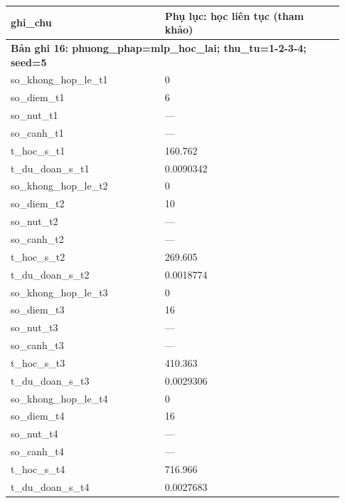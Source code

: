 \begin{longtable}{p{0.43\linewidth}p{0.50\linewidth}}
ghi\_\allowbreak chu & Phụ lục: học liên tục (tham khảo) \\
\midrule
\multicolumn{2}{p{0.95\linewidth}}{\textbf{Bản ghi 16: phuong\_phap=mlp\_hoc\_lai; thu\_tu=1-2-3-4; seed=5}} \\
so\_\allowbreak khong\_\allowbreak hop\_\allowbreak le\_\allowbreak t1 & 0 \\
so\_\allowbreak diem\_\allowbreak t1 & 6 \\
so\_\allowbreak nut\_\allowbreak t1 & — \\
so\_\allowbreak canh\_\allowbreak t1 & — \\
t\_\allowbreak hoc\_\allowbreak s\_\allowbreak t1 & 160.762 \\
t\_\allowbreak du\_\allowbreak doan\_\allowbreak s\_\allowbreak t1 & 0.0090342 \\
so\_\allowbreak khong\_\allowbreak hop\_\allowbreak le\_\allowbreak t2 & 0 \\
so\_\allowbreak diem\_\allowbreak t2 & 10 \\
so\_\allowbreak nut\_\allowbreak t2 & — \\
so\_\allowbreak canh\_\allowbreak t2 & — \\
t\_\allowbreak hoc\_\allowbreak s\_\allowbreak t2 & 269.605 \\
t\_\allowbreak du\_\allowbreak doan\_\allowbreak s\_\allowbreak t2 & 0.0018774 \\
so\_\allowbreak khong\_\allowbreak hop\_\allowbreak le\_\allowbreak t3 & 0 \\
so\_\allowbreak diem\_\allowbreak t3 & 16 \\
so\_\allowbreak nut\_\allowbreak t3 & — \\
so\_\allowbreak canh\_\allowbreak t3 & — \\
t\_\allowbreak hoc\_\allowbreak s\_\allowbreak t3 & 410.363 \\
t\_\allowbreak du\_\allowbreak doan\_\allowbreak s\_\allowbreak t3 & 0.0029306 \\
so\_\allowbreak khong\_\allowbreak hop\_\allowbreak le\_\allowbreak t4 & 0 \\
so\_\allowbreak diem\_\allowbreak t4 & 16 \\
so\_\allowbreak nut\_\allowbreak t4 & — \\
so\_\allowbreak canh\_\allowbreak t4 & — \\
t\_\allowbreak hoc\_\allowbreak s\_\allowbreak t4 & 716.966 \\
t\_\allowbreak du\_\allowbreak doan\_\allowbreak s\_\allowbreak t4 & 0.0027683 \\

\end{longtable}
